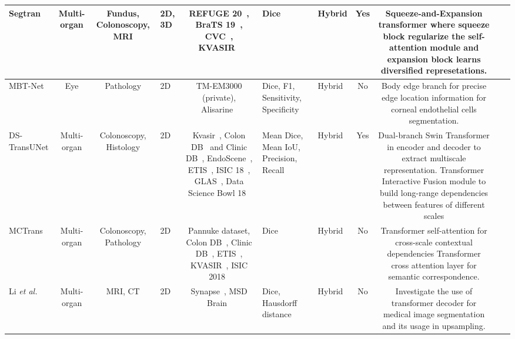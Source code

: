 \begin{table}[]
{\begin{adjustbox}{max width=1.2\textwidth}
\begin{tabular}{V{3}c|c|p{2.2cm}|c|p{3.5cm}|p{3cm}|c|c|p{11.5cm}V{3}}
Segtran\cite{li2021medical}         & Multi-organ    & Fundus, Colonoscopy, MRI & 2D, 3D        & REFUGE 20~\cite{orlando2020refuge}, BraTS 19~\cite{brats19}, CVC~\cite{fan2020pranet}, KVASIR~\cite{jha2020kvasir}                                               & Dice                                                         & Hybrid                & Yes  & Squeeze-and-Expansion transformer where squeeze block regularize the self-attention module and expansion block learns diversified represetations.                                                                           \\ \hline
MBT-Net\cite{zhang2021multi}         & Eye            & Pathology                & 2D            & TM-EM3000 (private), Alisarine~\cite{ruggeri2010system}                                                               & Dice, F1, Sensitivity, Specificity                           & Hybrid                & No   & Body edge branch for precise edge location information for corneal endothelial cells segmentation.                                                                                                     \\ \hline
DS-TransUNet\cite{lin2021ds}    & Multi-organ    & Colonoscopy, Histology   & 2D            & Kvasir~\cite{jha2020kvasir}, Colon DB~\cite{tajbakhsh2015automated} and Clinic DB~\cite{bernal2015wm}, EndoScene~\cite{vazquez2017benchmark}, ETIS~\cite{silva2014toward}, ISIC 18~\cite{codella2019skin}, GLAS~\cite{sirinukunwattana2017gland}, Data Science Bowl 18~\cite{caicedo2019nucleus} & Mean Dice, Mean IoU, Precision, Recall                       & Hybrid                & Yes  & Dual-branch Swin Transformer in encoder and decoder to extract multiscale representation. Transformer Interactive Fusion module to build long-range  dependencies between features of different scales \\ \hline
MCTrans\cite{ji2021multi}         & Multi-organ    & Colonoscopy, Pathology   & 2D            & Pannuke dataset, Colon DB~\cite{tajbakhsh2015automated}, Clinic DB~\cite{bernal2015wm}, ETIS~\cite{silva2014toward}, KVASIR~\cite{jha2020kvasir}, ISIC 2018~\cite{codella2019skin}                     & Dice                                                         & Hybrid                & No   & Transformer self-attention for cross-scale contextual dependencies Transformer cross attention layer for semantic correspondence.                                                                      \\ \hline
Li \textit{et al.}\cite{li2021more}       & Multi-organ    & MRI, CT                  & 2D            & Synapse~\cite{synapse}, MSD Brain~\cite{simpson2019large}                                                                 & Dice, Hausdorff distance                                     & Hybrid                & No   & Investigate the use of transformer decoder for medical image segmentation and its usage in upsampling.                                                                                                 \\ \hline

\end{tabular}
\end{adjustbox}}
\end{table}
